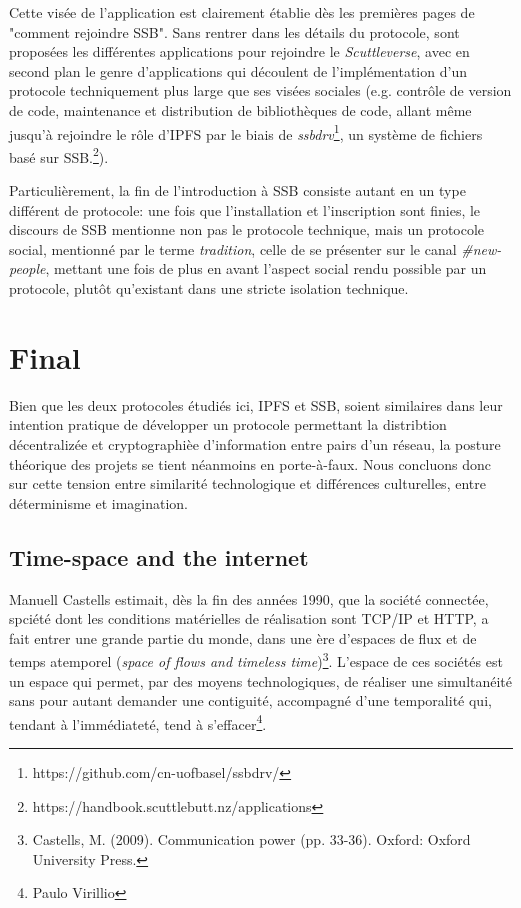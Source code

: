 \documentclass{article}
\begin{document}
Cette visée de l'application est clairement établie dès les premières pages de "comment rejoindre SSB". Sans rentrer dans les détails du protocole, sont proposées les différentes applications pour rejoindre le \emph{Scuttleverse}, avec en second plan le genre d'applications qui découlent de l'implémentation d'un protocole techniquement plus large que ses visées sociales (e.g. contrôle de version de code, maintenance et distribution de bibliothèques de code, allant même jusqu'à rejoindre le rôle d'IPFS par le biais de \emph{ssbdrv}\footnote{https://github.com/cn-uofbasel/ssbdrv/}, un système de fichiers basé sur SSB.\footnote{https://handbook.scuttlebutt.nz/applications}).

Particulièrement, la fin de l'introduction à SSB consiste autant en un type différent de protocole: une fois que l'installation et l'inscription sont finies, le discours de SSB mentionne non pas le protocole technique, mais un protocole social, mentionné par le terme \emph{tradition}, celle de se présenter sur le canal \emph{\#new-people}, mettant une fois de plus en avant l'aspect social rendu possible par un protocole, plutôt qu'existant dans une stricte isolation technique.

\section{Final}

Bien que les deux protocoles étudiés ici, IPFS et SSB, soient similaires dans leur intention pratique de développer un protocole permettant la distribtion décentralizée et cryptographièe d'information entre pairs d'un réseau, la posture théorique des projets se tient néanmoins en porte-à-faux. Nous concluons donc sur cette tension entre similarité technologique et différences culturelles, entre déterminisme et imagination.

\subsection{Time-space and the internet}

Manuell Castells estimait, dès la fin des années 1990, que la société connectée, spciété dont les conditions matérielles de réalisation sont TCP/IP et HTTP, a fait entrer une grande partie du monde, dans une ère d'espaces de flux et de temps atemporel (\emph{space of flows and timeless time})\footnote{Castells, M. (2009). Communication power (pp. 33-36). Oxford: Oxford University Press.}. L'espace de ces sociétés est un espace qui permet, par des moyens technologiques, de réaliser une simultanéité sans pour autant demander une contiguité, accompagné d'une temporalité qui, tendant à l'immédiateté, tend à s'effacer\footnote{Paulo Virillio}.
\end{document}
